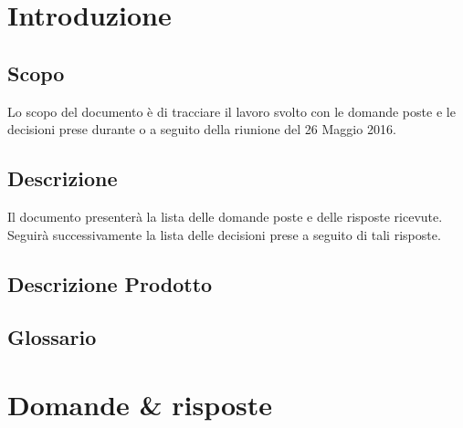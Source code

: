 \documentclass[12pt,a4paper]{article}
\newcommand{\dataCreazione}{26 Maggio 2016}
\begin{document}
\tableofcontents
\listoftables
\newpage

\section{Introduzione}

\subsection{Scopo}
Lo scopo del documento è di tracciare il lavoro svolto con le domande poste e le decisioni prese durante o a seguito della riunione del \dataCreazione.

\subsection{Descrizione}
Il documento presenterà la lista delle domande poste e delle risposte ricevute. Seguirà successivamente la lista delle decisioni prese a seguito di tali risposte.

\subsection{Descrizione Prodotto}
\descrizioneProdotto

\subsection{Glossario}
\glossarioPrint

\newpage


\section{Domande \& risposte}
\end{document}
